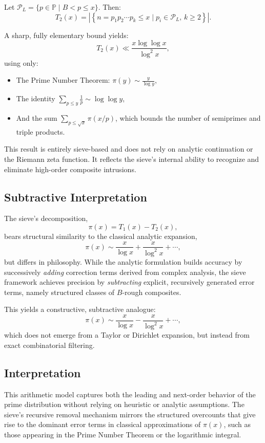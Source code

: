 \documentclass[11pt]{article}
\begin{document}
	Let \( \mathcal{P}_L = \{ p \in \mathbb{P} \mid B < p \leq x \} \). Then:
	\[
	T_2(x) = \left| \left\{ n = p_1 p_2 \cdots p_k \leq x \mid p_i \in \mathcal{P}_L, \, k \geq 2 \right\} \right|.
	\]
	
	A sharp, fully elementary bound yields:
	\[
	T_2(x) \ll \frac{x \log \log x}{\log^2 x},
	\]
	using only:
	\begin{itemize}
		\item The Prime Number Theorem: \( \pi(y) \sim \frac{y}{\log y} \),
		\item The identity \( \sum_{p \leq y} \frac{1}{p} \sim \log \log y \),
		\item And the sum \( \sum_{p \leq \sqrt{x}} \pi(x / p) \), which bounds the number of semiprimes and triple products.
	\end{itemize}
	
	This result is entirely sieve-based and does not rely on analytic continuation or the Riemann zeta function. It reflects the sieve’s internal ability to recognize and eliminate high-order composite intrusions.
	
	\subsection{Subtractive Interpretation}
	
	The sieve’s decomposition,
	\[
	\pi(x) = T_1(x) - T_2(x),
	\]
	bears structural similarity to the classical analytic expansion,
	\[
	\pi(x) \sim \frac{x}{\log x} + \frac{x}{\log^2 x} + \cdots,
	\]
	but differs in philosophy. While the analytic formulation builds accuracy by successively \emph{adding} correction terms derived from complex analysis, the sieve framework achieves precision by \emph{subtracting} explicit, recursively generated error terms, namely structured classes of $B$-rough composites.
	
	This yields a constructive, subtractive analogue:
	\[
	\pi(x) \sim \frac{x}{\log x} - \frac{x}{\log^2 x} + \cdots,
	\]
	which does not emerge from a Taylor or Dirichlet expansion, but instead from exact combinatorial filtering.

	\subsection{Interpretation}
	
	This arithmetic model captures both the leading and next-order behavior of the prime distribution without relying on heuristic or analytic assumptions. The sieve's recursive removal mechanism mirrors the structured overcounts that give rise to the dominant error terms in classical approximations of \( \pi(x) \), such as those appearing in the Prime Number Theorem or the logarithmic integral.
	
\end{document}
